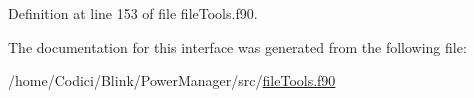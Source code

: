 Definition at line 153 of file file\-Tools.\-f90.



The documentation for this interface was generated from the following file\-:\begin{DoxyCompactItemize}
\item 
/home/\-Codici/\-Blink/\-Power\-Manager/src/\hyperlink{file_tools_8f90}{file\-Tools.\-f90}\end{DoxyCompactItemize}
